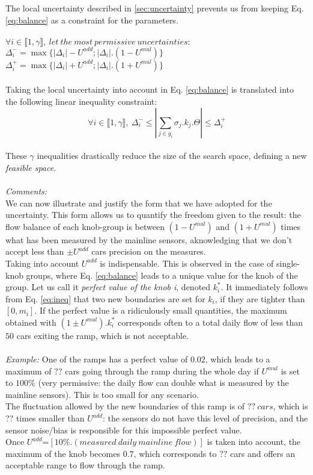 The local uncertainty described in \ref{sec:uncertainty} prevents us from keeping Eq. \ref{eq:balance} as a constraint for the parameters.\\
\\
$\forall i \in {\llbracket 1,\gamma \rrbracket},\ let\ the\ most\ permissive\ uncertainties:$\\
$\Delta_{i}^{-}=\max{\{|\Delta_{i}|-U^{add};|\Delta_{i}|.(1-U^{mul})\}}$\\
$\Delta_{i}^{+}=\max{\{|\Delta_{i}|+U^{add};|\Delta_{i}|.(1+U^{mul})\}}$\\
\\
Taking the local uncertainty into account in Eq. \ref{eq:balance} is translated into the following linear inequality constraint:
\begin{equation}
\label{eq:ineq}
	\forall i\in \llbracket 1,\gamma \rrbracket,\ \Delta_{i}^{-}\leq |\sum\limits_{j\in g_{i}}\sigma_{j}.k_{j}.\Theta| \leq \Delta_{i}^{+}
\end{equation}
\\
These $\gamma$ inequalities drastically reduce the size of the search space, defining a new \emph{feasible space}.\\
\\
\emph{Comments:}\\
We can now illustrate and justify the form that we have adopted for the uncertainty. This form allows us to quantify the freedom given to the result: the flow balance of each knob-group is between $(1-U^{mul})$ and $(1+U^{mul})$ times what has been measured by the mainline sensors, aknowledging that we don't accept less than $\pm U^{add}$ cars precision on the measures.\\
Taking into account $U^{add}$ is indispensable. This is observed in the case of single-knob groups, where Eq. \ref{eq:balance} leads to a unique value for the knob of the group. Let us call it \emph{perfect value of the knob i}, denoted $k_{i}^{*}$. It immediately follows from Eq. \ref{eq:ineq} that two new boundaries are set for $k_{i}$, if they are tighter than $[0,m_{i}]$.  If the perfect value is a ridiculously small quantities, the maximum obtained with $(1\pm U^{mul}).k_{i}^{*}$ corresponds often to a total daily flow of less than $50$ cars exiting the ramp, which is not acceptable.\\ 
\\
\emph{Example:} One of the ramps has a perfect value of $0.02$, which leads to a maximum of $??$ cars going through the ramp during the whole day if $U^{mul}$ is set to $100\%$ (very permissive: the daily flow can double what is measured by the mainline sensors). This is too small for any scenario.\\ The fluctuation allowed by the new boundaries of this ramp is of $??\ cars$, which is ?? times smaller than $U^{add}$: the sensors do not have this level of precision, and the sensor noise/bias is responsible for this impossible perfect value. \\
Once $U^{add}$=$[10\%.(measured\ daily\ mainline\ flow)]$ is taken into account, the maximum of the knob becomes $0.7$, which corresponds to $??$ cars and offers an acceptable range to flow through the ramp.\\